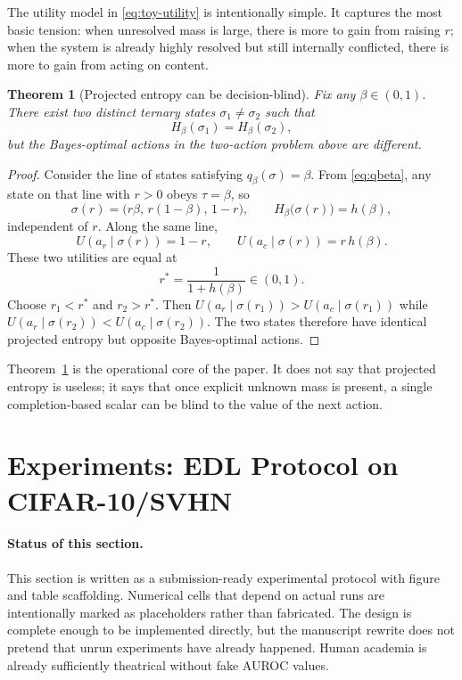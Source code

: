 \documentclass[11pt]{article}
\newtheorem{theorem}[definition]{Theorem}
\newcommand{\1}{\mathbf{1}}
\newcommand{\hbin}{h}
\begin{document}
The utility model in \eqref{eq:toy-utility} is intentionally simple. It captures the most basic tension: when unresolved mass is large, there is more to gain from raising $r$; when the system is already highly resolved but still internally conflicted, there is more to gain from acting on content.

\begin{theorem}[Projected entropy can be decision-blind]
\label{thm:decision-blind}
Fix any $\beta\in(0,1)$. There exist two distinct ternary states $\sigma_1\neq \sigma_2$ such that
\begin{equation}
H_\beta(\sigma_1)=H_\beta(\sigma_2),
\label{eq:same-Hbeta}
\end{equation}
but the Bayes-optimal actions in the two-action problem above are different.
\end{theorem}

\begin{proof}
Consider the line of states satisfying $q_\beta(\sigma)=\beta$. From \eqref{eq:qbeta}, any state on that line with $r>0$ obeys $\tau=\beta$, so
\[
\sigma(r)=\bigl(r\beta,\,r(1-\beta),\,1-r\bigr),
\qquad
H_\beta\bigl(\sigma(r)\bigr)=\hbin(\beta),
\]
independent of $r$. Along the same line,
\[
U(a_r\mid\sigma(r))=1-r,
\qquad
U(a_c\mid\sigma(r))=r\,\hbin(\beta).
\]
These two utilities are equal at
\[
r^*=\frac{1}{1+\hbin(\beta)}\in(0,1).
\]
Choose $r_1<r^*$ and $r_2>r^*$. Then $U(a_r\mid\sigma(r_1))>U(a_c\mid\sigma(r_1))$ while $U(a_r\mid\sigma(r_2))<U(a_c\mid\sigma(r_2))$. The two states therefore have identical projected entropy but opposite Bayes-optimal actions.
\end{proof}

Theorem~\ref{thm:decision-blind} is the operational core of the paper. It does not say that projected entropy is useless; it says that once explicit unknown mass is present, a single completion-based scalar can be blind to the value of the next action.

\section{Experiments: EDL Protocol on CIFAR-10/SVHN}

\paragraph{Status of this section.}
This section is written as a submission-ready experimental protocol with figure and table scaffolding. Numerical cells that depend on actual runs are intentionally marked as placeholders rather than fabricated. The design is complete enough to be implemented directly, but the manuscript rewrite does not pretend that unrun experiments have already happened. Human academia is already sufficiently theatrical without fake AUROC values.
\end{document}
